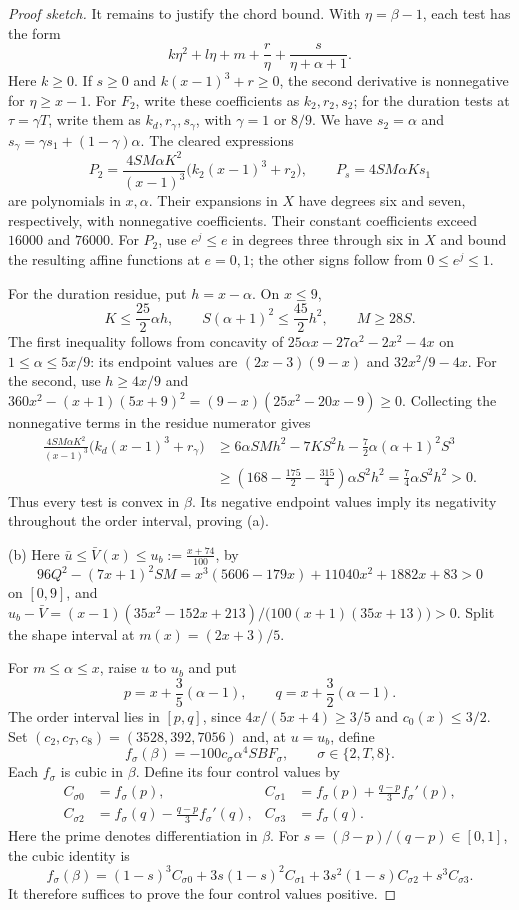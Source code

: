 \begin{proof}[Proof sketch]
It remains to justify the chord bound. With $\eta=\beta-1$, each test has
the form
\[
 k\eta^2+l\eta+m+\frac r\eta+\frac s{\eta+\alpha+1}.
\]
Here $k\ge0$. If $s\ge0$ and $k(x-1)^3+r\ge0$, the second derivative
is nonnegative for $\eta\ge x-1$. For $F_2$, write these coefficients as
$k_2,r_2,s_2$; for the duration tests at $\tau=\gamma T$, write them as
$k_d,r_\gamma,s_\gamma$, with $\gamma=1$ or $8/9$.
We have $s_2=\alpha$ and
$s_\gamma=\gamma s_1+(1-\gamma)\alpha$. The cleared expressions
\[
 P_2=\frac{4SM\alpha K^2}{(x-1)^3}\bigl(k_2(x-1)^3+r_2\bigr),
 \qquad P_s=4SM\alpha K s_1
\]
are polynomials in $x,\alpha$. Their expansions in $X$ have degrees six
and seven, respectively, with nonnegative coefficients. Their constant
coefficients exceed $16000$ and $76000$. For $P_2$, use $e^j\le e$ in
degrees three through six in $X$ and bound the resulting affine functions
at $e=0,1$; the other signs follow from $0\le e^j\le1$.

For the duration residue, put $h=x-\alpha$. On $x\le9$,
\[
 K\le\frac{25}2\alpha h,\qquad
 S(\alpha+1)^2\le\frac{45}2h^2,\qquad M\ge28S.
\]
The first inequality follows from concavity of
$25\alpha x-27\alpha^2-2x^2-4x$ on $1\le\alpha\le5x/9$:
its endpoint values are $(2x-3)(9-x)$ and $32x^2/9-4x$.
For the second, use $h\ge4x/9$ and
$360x^2-(x+1)(5x+9)^2=(9-x)(25x^2-20x-9)\ge0$.
Collecting the nonnegative terms in the residue numerator gives
\begin{align*}
 \frac{4SM\alpha K^2}{(x-1)^3}
   \bigl(k_d(x-1)^3+r_\gamma\bigr)
 &\ge6\alpha SMh^2-7KS^2h-\frac72\alpha(\alpha+1)^2S^3\\
 &\ge\left(168-\frac{175}2-\frac{315}4\right)\alpha S^2h^2
   =\frac74\alpha S^2h^2>0.
\end{align*}
Thus every test is convex in $\beta$. Its negative endpoint values imply
its negativity throughout the order interval, proving (a).

(b) Here $\bar u\le\bar V(x)\le u_b:=\frac{x+74}{100}$, by
\[
 96Q^2-(7x+1)^2SM
 =x^3(5606-179x)+11040x^2+1882x+83>0
\]
on $[0,9]$, and
$u_b-\bar V=(x-1)(35x^2-152x+213)/\bigl(100(x+1)(35x+13)\bigr)>0$.
Split the shape interval at $m(x)=(2x+3)/5$.

For $m\le\alpha\le x$, raise $u$ to $u_b$ and put
\[
 p=x+\frac35(\alpha-1),\qquad q=x+\frac32(\alpha-1).
\]
The order interval lies in $[p,q]$, since
$4x/(5x+4)\ge3/5$ and $c_0(x)\le3/2$.
Set $(c_2,c_T,c_8)=(3528,392,7056)$ and, at $u=u_b$, define
\[
 f_\sigma(\beta)=-100c_\sigma\alpha^4SB F_\sigma,
 \qquad \sigma\in\{2,T,8\}.
\]
Each $f_\sigma$ is cubic in $\beta$. Define its four control values by
\begin{align*}
 C_{\sigma0}&=f_\sigma(p),&
 C_{\sigma1}&=f_\sigma(p)+\frac{q-p}3 f_\sigma'(p),\\
 C_{\sigma2}&=f_\sigma(q)-\frac{q-p}3 f_\sigma'(q),&
 C_{\sigma3}&=f_\sigma(q).
\end{align*}
Here the prime denotes differentiation in $\beta$. For
$s=(\beta-p)/(q-p)\in[0,1]$, the cubic identity is
\[
 f_\sigma(\beta)=(1-s)^3C_{\sigma0}
 +3s(1-s)^2C_{\sigma1}
 +3s^2(1-s)C_{\sigma2}+s^3C_{\sigma3}.
\]
It therefore suffices to prove the four control values positive.


\end{proof}
